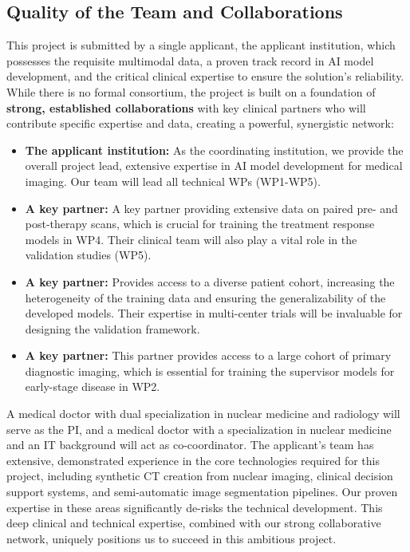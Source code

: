 \documentclass[11pt, a4paper]{article}
\begin{document}
\subsection{Quality of the Team and Collaborations}
This project is submitted by a single applicant, the applicant institution, which possesses the requisite multimodal data, a proven track record in AI model development, and the critical clinical expertise to ensure the solution's reliability. While there is no formal consortium, the project is built on a foundation of \textbf{strong, established collaborations} with key clinical partners who will contribute specific expertise and data, creating a powerful, synergistic network:
\begin{itemize}
    \item \textbf{The applicant institution:} As the coordinating institution, we provide the overall project lead, extensive expertise in AI model development for medical imaging. Our team will lead all technical WPs (WP1-WP5).
    \item \textbf{A key partner:} A key partner providing extensive data on paired pre- and post-therapy scans, which is crucial for training the treatment response models in WP4. Their clinical team will also play a vital role in the validation studies (WP5).
    \item \textbf{A key partner:} Provides access to a diverse patient cohort, increasing the heterogeneity of the training data and ensuring the generalizability of the developed models. Their expertise in multi-center trials will be invaluable for designing the validation framework.
    \item \textbf{A key partner:} This partner provides access to a large cohort of primary diagnostic imaging, which is essential for training the supervisor models for early-stage disease in WP2.
\end{itemize}
A medical doctor with dual specialization in nuclear medicine and radiology will serve as the PI, and a medical doctor with a specialization in nuclear medicine and an IT background will act as co-coordinator. The applicant's team has extensive, demonstrated experience in the core technologies required for this project, including synthetic CT creation from nuclear imaging, clinical decision support systems, and semi-automatic image segmentation pipelines. Our proven expertise in these areas significantly de-risks the technical development. This deep clinical and technical expertise, combined with our strong collaborative network, uniquely positions us to succeed in this ambitious project.
\end{document}
